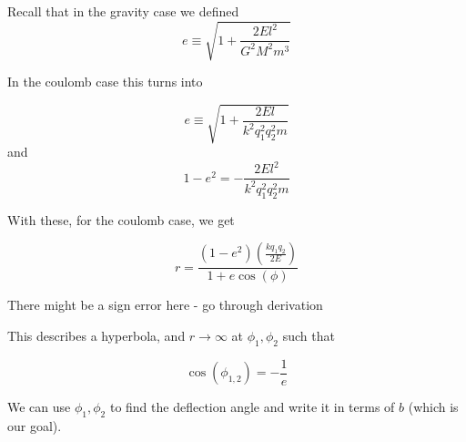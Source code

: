\documentclass[11pt]{article}
\begin{document}
Recall that in the gravity case we defined 
\[ e \equiv \sqrt{1 + \frac{2E l^2}{G^2 M^2 m^3}} \]


In the coulomb case this turns into 

\[ e \equiv \sqrt{1 + \frac{2El}{k^2 q_1^2 q_2^2 m}} \]
and 
\[ 1 - e^2 = -\frac{2E l^2}{k^2 q_1^2 q_2^2 m} \]

With these, for the coulomb case, we get 

\[ \boxed{r = \frac{(1-e^2) \left(\frac{kq_1 q_2}{2E}\right) }{1+e\cos(\phi)} } \]

\begin{note}
  {There might be a sign error here - go through derivation}
\end{note}

This describes a hyperbola, and $r \rightarrow \infty$ at $\phi_1, \phi_2$ such that 

\[ \cos(\phi_{1,2}) = -\frac{1}{e}  \]

We can use $\phi_1, \phi_2$ to find the deflection angle and write it in terms of $b$ (which is our goal).
\end{document}
